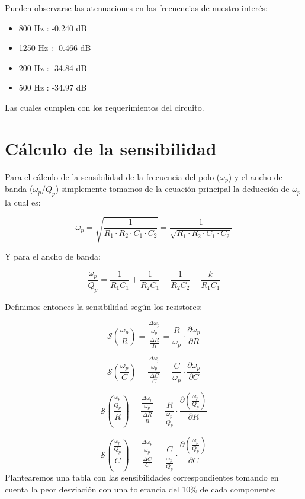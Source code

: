 \hspace{1mm} Pueden observarse las atenuaciones en las frecuencias de nuestro interés: 

\begin{itemize}
\item 800 Hz : -0.240 dB
\item 1250 Hz : -0.466 dB
\item 200 Hz : -34.84 dB
\item 500 Hz : -34.97 dB
\end{itemize}
\hspace{1mm} Las cuales cumplen con los requerimientos del circuito.

\newpage

\section{Cálculo de la sensibilidad}
\hspace{1mm} Para el cálculo de la sensibilidad de la frecuencia del polo (\(\omega_p\)) y el ancho de banda (\(\omega_p / Q_p\)) simplemente tomamos de la ecuación principal la deducción de \(\omega_p\) la cual es:

\[\omega_p = \sqrt{\frac{1}{R_1 \cdot R_2 \cdot C_1 \cdot C_2}} = \frac{1}{\sqrt{R_1 \cdot R_2 \cdot C_1 \cdot C_2}}\]

\hspace{1mm}Y para el ancho de banda:

\[\frac{\omega_p}{Q_p} = \frac{1}{R_1 C_1} + \frac{1}{R_2 C_1} + \frac{1}{R_2 C_2} - \frac{k}{R_1 C_1}\]

\hspace{1mm}Definimos entonces la sensibilidad según los resistores:

\[
\mathcal{S}\left(\frac{\omega_p}{R}\right) = \frac{\frac{\Delta \omega_p}{\omega_p}}{\frac{\Delta R}{R}} = \frac{R}{\omega_p} \cdot \frac{\partial \omega_p}{\partial R}
\]

\[
\mathcal{S}\left(\frac{\omega_p}{C}\right) = \frac{\frac{\Delta \omega_p}{\omega_p}}{\frac{\Delta C}{C}} = \frac{C}{\omega_p} \cdot \frac{\partial \omega_p}{\partial C}
\]

\[
\mathcal{S}\left(\frac{\frac{\omega_p}{Q_p}}{R}\right) = \frac{\frac{\Delta \omega_p}{\omega_p}}{\frac{\Delta R}{R}} = \frac{R}{\frac{\omega_p}{Q_p}} \cdot \frac{\partial \left(\frac{\omega_p}{Q_p}\right)}{\partial R}
\]

\[
\mathcal{S}\left(\frac{\frac{\omega_p}{Q_p}}{C}\right) = \frac{\frac{\Delta \omega_p}{\omega_p}}{\frac{\Delta C}{C}} = \frac{C}{\frac{\omega_p}{Q_p}} \cdot \frac{\partial \left(\frac{\omega_p}{Q_p}\right)}{\partial C}
\]
 \hspace{1mm} Plantearemos una tabla con las sensibilidades correspondientes tomando en cuenta la peor desviación con una tolerancia del 10\% de cada componente:

